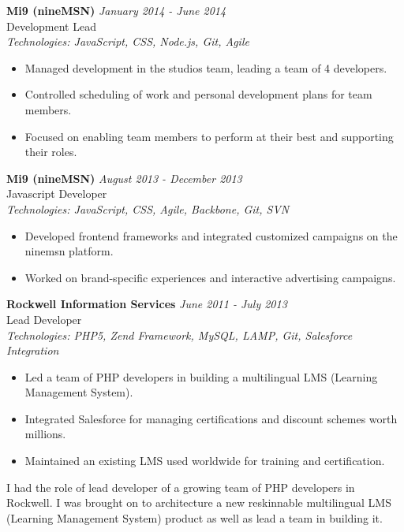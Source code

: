 \documentclass[a4paper,10pt]{article}
\begin{document}
\vspace{1em}

\textbf{Mi9 (nineMSN)} \hfill \textit{January 2014 - June 2014} \\
Development Lead \\
\textit{Technologies: JavaScript, CSS, Node.js, Git, Agile}
\begin{itemize}
    \item Managed development in the studios team, leading a team of 4 developers.
    \item Controlled scheduling of work and personal development plans for team members.
    \item Focused on enabling team members to perform at their best and supporting their roles.
\end{itemize}

\vspace{1em}

\textbf{Mi9 (nineMSN)} \hfill \textit{August 2013 - December 2013} \\
Javascript Developer \\
\textit{Technologies: JavaScript, CSS, Agile, Backbone, Git, SVN}
\begin{itemize}
    \item Developed frontend frameworks and integrated customized campaigns on the ninemsn platform.
    \item Worked on brand-specific experiences and interactive advertising campaigns.
\end{itemize}

\vspace{1em}

\textbf{Rockwell Information Services} \hfill \textit{June 2011 - July 2013} \\
Lead Developer \\
\textit{Technologies: PHP5, Zend Framework, MySQL, LAMP, Git, Salesforce Integration}
\begin{itemize}
    \item Led a team of PHP developers in building a multilingual LMS (Learning Management System).
    \item Integrated Salesforce for managing certifications and discount schemes worth millions.
    \item Maintained an existing LMS used worldwide for training and certification.
\end{itemize}

I had the role of lead developer of a growing team of PHP developers in Rockwell. I was brought on to architecture a new reskinnable multilingual LMS (Learning Management System) product as well as lead a team in building it.
\end{document}
